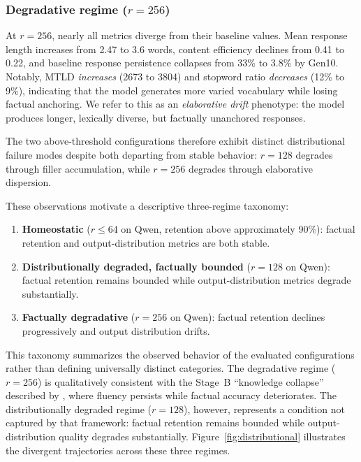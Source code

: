 \documentclass[a4paper,fleqn]{cas-dc}
\begin{document}
\subsubsection{Degradative regime ($r=256$)}
At $r=256$, nearly all metrics diverge from their baseline values. Mean response
length increases from 2.47 to 3.6 words, content efficiency declines from 0.41
to 0.22, and baseline response persistence collapses from 33\% to 3.8\% by
Gen10. Notably, MTLD \textit{increases} (2673 to 3804) and stopword ratio
\textit{decreases} (12\% to 9\%), indicating that the model generates more
varied vocabulary while losing factual anchoring. We refer to this as an
\textit{elaborative drift} phenotype: the model produces longer, lexically
diverse, but factually unanchored responses.

The two above-threshold configurations therefore exhibit distinct distributional
failure modes despite both departing from stable behavior: $r=128$ degrades
through filler accumulation, while $r=256$ degrades through elaborative
dispersion.

These observations motivate a descriptive three-regime taxonomy:

\begin{enumerate}
    \item \textbf{Homeostatic} ($r \leq 64$ on Qwen, retention above
    approximately 90\%): factual retention and output-distribution metrics are
    both stable.
    \item \textbf{Distributionally degraded, factually bounded} ($r=128$ on
    Qwen): factual retention remains bounded while output-distribution metrics
    degrade substantially.
    \item \textbf{Factually degradative} ($r=256$ on Qwen): factual retention
    declines progressively and output distribution drifts.
\end{enumerate}

This taxonomy summarizes the observed behavior of the evaluated configurations
rather than defining universally distinct categories. The degradative regime
($r=256$) is qualitatively consistent with the Stage~B ``knowledge collapse''
described by \citet{keisha2025}, where fluency persists while factual accuracy
deteriorates. The distributionally degraded regime ($r=128$), however, represents
a condition not captured by that framework: factual retention remains bounded
while output-distribution quality degrades substantially.
Figure~\ref{fig:distributional} illustrates the divergent trajectories across
these three regimes.
\end{document}
